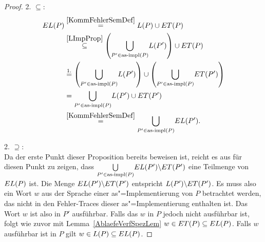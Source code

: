 \begin{proof}
  2. \glqq$\subseteq$\grqq{}:
  {\allowdisplaybreaks
  \begin{align*}
    EL (P)&\overset{\ref{KommFehlerSemDef}}{=} L(P)\cup ET (P)\\
    &\overset{\ref{LImpProp}}{\subseteq} \left(\underset{P'\in\mathrm{as}\text{-}\mathrm{impl}
    (P)}{\bigcup} L (P')\right)\cup ET (P)\\
    &\overset{1.}{=} \left(\underset{P'\in\mathrm{as}\text{-}\mathrm{impl} (P)}{\bigcup} L
    (P')\right)\cup \left(\underset{P'\in\mathrm{as}\text{-}\mathrm{impl} (P)}{\bigcup} ET (P')\right)\\
    &= \underset{P'\in\mathrm{as}\text{-}\mathrm{impl} (P)}{\bigcup} L (P')\cup ET (P')\\
    &\overset{\ref{KommFehlerSemDef}}{=} \underset{P'\in\mathrm{as}\text{-}\mathrm{impl} (P)}{\bigcup}
    EL (P').
  \end{align*}}

  2. \glqq$\supseteq$\grqq{}:\\
  Da der erste Punkt dieser Proposition bereits beweisen ist, reicht es aus für
  diesen Punkt zu zeigen, dass $\underset{P'\in\mathrm{as}\text{-}\mathrm{impl} (P)}{\bigcup} EL
  (P')\backslash ET (P')$ eine Teilmenge von $EL (P)$ ist. Die Menge $EL
  (P')\backslash ET (P')$ entspricht $L (P') \backslash ET (P')$. Es muss
  also ein Wort $w$ aus der Sprache einer as"=Implementierung von $P$
  betrachtet werden, das nicht in den Fehler-Traces dieser as"=Implementierung
  enthalten ist. Das Wort $w$ ist also in $P'$ ausführbar. Falls das $w$ in $P$
  jedoch nicht ausführbar ist, folgt wie zuvor mit
  Lemma~\ref{AblaefeVerfSpezLem} $w\in ET (P)\subseteq EL (P)$. Falls $w$
  ausführbar ist in $P$ gilt $w\in L(P)\subseteq EL (P)$.
\end{proof}

